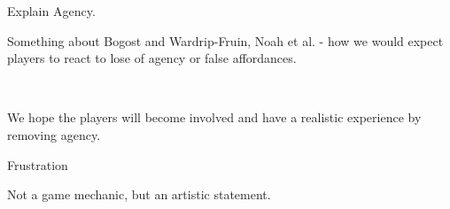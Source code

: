 Explain Agency.

Something about Bogost and Wardrip-Fruin, Noah et al.  - how we would expect players to react to lose of agency or false affordances.\

\

We hope the players will become involved and have a realistic experience by removing agency. \

Frustration\

Not a game mechanic, but an artistic statement. 
